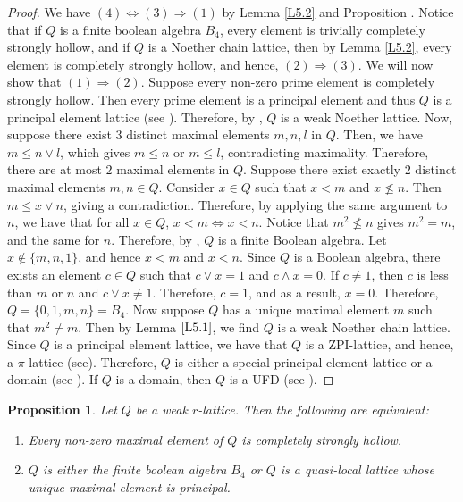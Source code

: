 \documentclass[11pt,english]{amsart}
\newtheorem{proposition}[theorem]{Proposition}
\theoremstyle{definition}
\numberwithin{equation}{section}
\theoremstyle{remark}
\def\leq{\leqslant}
\begin{document}
	\begin{proof}
		We have  $(4)\Leftrightarrow (3)\Rightarrow(1)$ by Lemma \ref{L5.2} and Proposition \label{P5.3}. Notice that if $Q$ is a finite boolean algebra $B_4$, every element is trivially completely strongly hollow, and if $Q$ is a Noether chain lattice, then by Lemma \ref{L5.2}, every element is completely strongly hollow, and hence, $(2)\Rightarrow(3)$. We will now show that $(1)\Rightarrow(2)$. Suppose every non-zero prime element is completely strongly hollow. Then every prime element is a principal element and thus $Q$ is a principal element lattice (see \cite[p.~586]{Pri-Pru}). Therefore, by \cite[Theorem~1.1]{AJ-PE-1996},  $Q$ is a weak Noether lattice. Now, suppose there exist $3$ distinct maximal elements $m,n,l$ in $Q$. Then, we have  $m\leq n\vee l$, which gives  $m\leq n$ or $m\leq l$, contradicting maximality. Therefore, there are at most $2$ maximal elements in $Q$. Suppose there exist exactly $2$ distinct maximal elements $m,n\in Q$. Consider $x\in Q$ such that $x< m$ and $x\nleq n$. Then $m\leq x\vee n$, giving a contradiction. Therefore, by applying the same argument to $n$, we have that for all $x\in Q$, \(x<m \Leftrightarrow x<n\). Notice that $m^2\nleq n$ gives $m^2=m$, and the same for $n$. Therefore, by \cite[Theorem~2.3]{Abs-CIT}, $Q$ is a finite Boolean algebra. Let $x\notin \{m,n,1\}$, and hence $x<m$ and $x<n$. Since $Q$ is a Boolean algebra, there exists an element $c\in Q$ such that $c\vee x=1$ and $c\wedge x=0$. If $c\neq 1$, then $c$ is less than $m$ or $n$ and $c\vee x\neq 1$. Therefore, $c=1$, and as a result, $x=0$. Therefore, $Q=\{0,1,m,n\}=B_4$. Now suppose $Q$ has a unique maximal element $m$ such that $m^2\neq m$. Then by Lemma $\ref{L5.1}$, we find $Q$ is a weak Noether chain lattice. Since $Q$ is a principal element lattice, we have that $Q$ is a ZPI-lattice, and hence, a $\pi$-lattice (see\cite[Theorem~8]{Pri-Pru}). Therefore, $Q$ is either a special principal element lattice or a domain (see \cite[Corollary~2.1]{AJ-PE-1996}). If $Q$ is a domain, then $Q$ is a UFD (see \cite[Corollary~2.3]{AJ-PE-1996}).
	\end{proof}
	
	\begin{proposition}\label{P5.6}
		Let $Q$ be a weak $r$-lattice. Then the following are equivalent:
		\begin{enumerate}
			\item Every non-zero maximal element of $Q$ is completely strongly hollow.
			
			\item $Q$ is either the finite boolean algebra $B_4$ or $Q$ is a quasi-local lattice whose unique maximal element is principal.
		\end{enumerate}
	\end{proposition}
	
\end{document}
